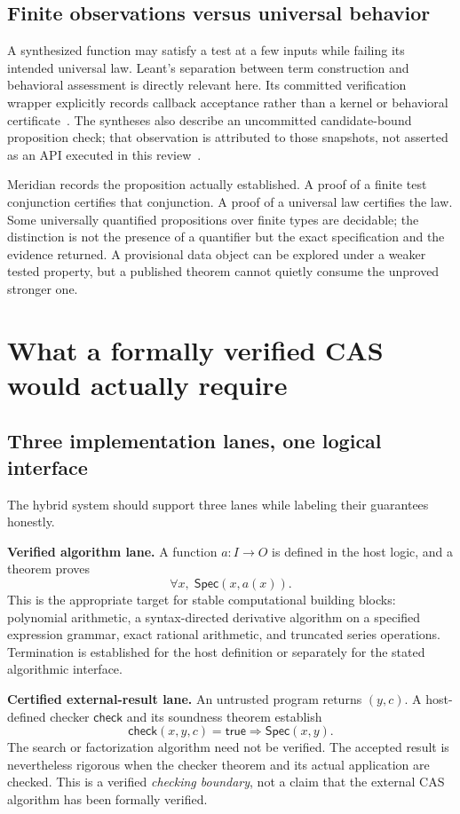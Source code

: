 \documentclass[11pt,a4paper]{article}
\newcommand{\Spec}{\mathsf{Spec}}
\theoremstyle{remark}
\begin{document}
\subsection{Finite observations versus universal behavior}
A synthesized function may satisfy a test at a few inputs while failing its
intended universal law. Leant's separation between term construction and
behavioral assessment is directly relevant here. Its committed verification
wrapper explicitly records callback acceptance rather than a kernel or behavioral
certificate~\cite{lverify}. The syntheses also describe an uncommitted
candidate-bound proposition check; that observation is attributed to those
snapshots, not asserted as an API executed in this review~\cite{synA,synB}.

Meridian records the proposition actually established. A proof of a finite test
conjunction certifies that conjunction. A proof of a universal law certifies the
law. Some universally quantified propositions over finite types are decidable;
the distinction is not the presence of a quantifier but the exact specification
and the evidence returned. A provisional data object can be explored under a
weaker tested property, but a published theorem cannot quietly consume the
unproved stronger one.

\section{What a formally verified CAS would actually require}
\label{sec:cas}
\subsection{Three implementation lanes, one logical interface}
The hybrid system should support three lanes while labeling their guarantees
honestly.

\textbf{Verified algorithm lane.} A function $a:I\to O$ is defined in the host
logic, and a theorem proves
\[
 \forall x,\;\Spec(x,a(x)).
\]
This is the appropriate target for stable computational building blocks:
polynomial arithmetic, a syntax-directed derivative algorithm on a specified
expression grammar, exact rational arithmetic, and truncated series operations.
Termination is established for the host definition or separately for the stated
algorithmic interface.

\textbf{Certified external-result lane.} An untrusted program returns $(y,c)$.
A host-defined checker $\mathsf{check}$ and its soundness theorem establish
\[
 \mathsf{check}(x,y,c)=\mathsf{true}\Longrightarrow\Spec(x,y).
\]
The search or factorization algorithm need not be verified. The accepted result
is nevertheless rigorous when the checker theorem and its actual application
are checked. This is a verified \emph{checking boundary}, not a claim that the
external CAS algorithm has been formally verified.
\end{document}

